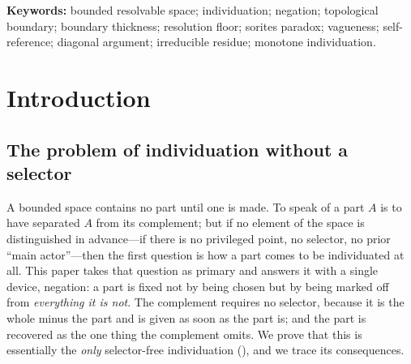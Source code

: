 \documentclass[11pt,a4paper]{article}
\theoremstyle{thmstyle}
\theoremstyle{definition}
\theoremstyle{remark}
\newcommand{\thick}{\beta}
\begin{document}
\begin{abstract}
realisable as a region---which embedding makes natural but which we do not claim
to discharge in general---the irreducible residue is therefore not a locatable set
but a self-referential impossibility that cannot be exhibited, only bounded below
by $\thick$. The positivity of $\thick$ itself is established earlier and
unconditionally. From this we obtain a \emph{Non-Return Theorem}---the count of
committed separations is monotone non-decreasing under every traversal, so no
process returns to a prior individuation state, and resemblance never entails
identity---and an \emph{Inquiry--Cessation Theorem}: thinning a separator
toward zero content has diverging cost and bounded return, so a finite agent
halts at the floor, and knowledge thereafter attaches to bounded wholes and
never to their sub-floor parts. Every claim is proved from stated definitions
and is additionally verified on explicitly constructed instances of the
hypothesis, where an exhaustive numerical check finds every measured quantity in
agreement with the predicted bound; uncertain material has been omitted.
\end{abstract}

\noindent\textbf{Keywords:} bounded resolvable space; individuation;
negation; topological boundary; boundary thickness; resolution floor; sorites
paradox; vagueness; self-reference; diagonal argument; irreducible residue;
monotone individuation.

\tableofcontents

\section{Introduction}
\label{sec:intro}

\subsection{The problem of individuation without a selector}

A bounded space contains no part until one is made. To speak of a part $A$ is
to have separated $A$ from its complement; but if no element of the space is
distinguished in advance---if there is no privileged point, no selector, no
prior ``main actor''---then the first question is how a part comes to be
individuated at all. This paper takes that question as primary and answers it
with a single device, negation: a part is fixed not by being chosen but by
being marked off from \emph{everything it is not}. The complement requires no
selector, because it is the whole minus the part and is given as soon as the
part is; and the part is recovered as the one thing the complement omits. We
prove that this is essentially the \emph{only} selector-free individuation
(), and we trace its consequences.
\end{document}
